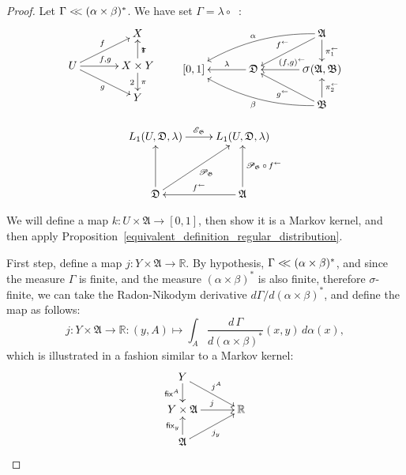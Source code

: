 \documentclass[
twoside=true,
paper=letter,
fontsize=9pt,
pagesize=auto,
leqno,
openany,
headsepline,
overfullrule,
]{scrbook}
\theoremstyle{plain}
\theoremstyle{plain}
\theoremstyle{definition}
\theoremstyle{bfnoteitalic}
\theoremstyle{bfnoteroman}
\newcommand{\sigalg}[1]{\mathfrak{#1}}
\newcommand{\cali}[1]{\mathscr{#1}}
\newcommand{\sfop}[1]{\mathsf{#1}}
\newcommand{\condexpop}[1]{\mathop{\cali{E}\hspace{-1pt}}\nolimits_{#1}}
\newcommand{\condprobop}[1]{\mathop{\cali{P}\hspace{-1pt}}\nolimits_{#1}}
\newcommand{\sagb}{\mathop{\hbox{\large{$\sigma$}}}\nolimits}
\newcommand{\textsigma}{\hbox{\large{$\sigma$}}\kern-1pt}
\newcommand{\preimage}[1]{\mathop{#1^{\leftarrow}}}
\newcommand{\R}{\mathbb{R}}
\newcommand{\sigmaalgebra}{\sigalg{A}}
\newcommand{\sigmaalgebraii}{\sigalg{B}}
\newcommand{\productsig}[2]{\sagb(#1,#2)}
\newcommand{\funcf}{f}
\newcommand{\funcg}{g}
\newcommand{\funcj}{j}
\newcommand{\funck}{k}
\newcommand{\function}{f}
\newcommand{\measurespace}{X}
\newcommand{\measurespaceii}{Y}
\newcommand{\mspaceelt}{x}
\newcommand{\mspaceeltii}{y}
\newcommand{\abscont}{\mathrel{< \kern-3.5pt <}}
\newcommand{\measlambda}{\lambda}
\newcommand{\seti}{A}
\newcommand{\projectionone}{\pi_1}
\newcommand{\projectiontwo}{\pi_2}
\newcommand{\fixinthefirst}[1]{\sfop{fix}_{#1}}
\newcommand{\fixinthesecond}[1]{\sfop{fix}^{#1}}
\newcommand{\uspace}{U}%
\newcommand{\uspacesig}{\sigalg{D}}
\newcommand{\joint}{\Gamma}%
\newcommand{\measonprod}{\Gamma}%
\newcommand{\marginalone}{\alpha}%
\newcommand{\marginaltwo}{\beta}%
\begin{document}
\begin{proof}
Let $\joint \abscont (\marginalone\times\marginaltwo)^*$.
We have set
$\joint = \measlambda\circ\preimage{({\funcf,\funcg})}$:
\[
\xymatrix@R=16pt@C=34pt{
 & \measurespace
 \\
 \uspace
 \ar[ur]^{\funcf}
 \ar[dr]_{\funcg}
 \ar[r]^{\funcf, \funcg} &
 \measurespace \times \measurespaceii  \ar[u]_\projectionone \ar[d]^\projectiontwo
 \\
 & \measurespaceii  \\
}
\qquad
\xymatrix@R=18pt@C=34pt{
 & & \sigmaalgebra
 \ar[dl]_{\preimage{\funcf}}
 \ar[d]^{\preimage{\projectionone}}
 \ar@/_10pt/[lld]_{\marginalone}
 \\
 [0,1] & \uspacesig \ar[l]_-{\measlambda} &
 \productsig{\sigmaalgebra}{\sigmaalgebraii}
 \ar[l]_{\hskip8pt \preimage{(\funcf,\funcg)}}
 \\
 & & \sigmaalgebraii
  \ar[u]_{\preimage{\projectiontwo}}
  \ar[ul]^{\preimage{\funcg}}
  \ar@/^10pt/[llu]^{\marginaltwo}
  \\
}
\]


\[%
\xymatrix@R=16pt@C=24pt{
L_1(\uspace, \uspacesig, \measlambda) \ar[r]^{\condexpop{\sigalg{G}}}
& L_1(\uspace, \uspacesig, \measlambda)
\\
&
\\
\uspacesig \ar[uu] \ar[uur]_{ \condprobop{\sigalg{G}} }
& \sigmaalgebra
\ar[uu]_{ \condprobop{\sigalg{G}} \circ \preimage{\function} }
\ar[l]_{\preimage{\funcf}}
\\
}
\]

We will define a map
$\funck: \uspace\times \sigmaalgebra \to [0,1]$, then show it is a Markov kernel, and then apply Proposition~\ref{equivalent_definition_regular_distribution}.


First step, define a map
$\funcj:\measurespaceii\times\sigmaalgebra\to \R$. By hypothesis,
$\measonprod \abscont (\marginalone\times\marginaltwo)^*$, and since the measure
$\measonprod$ is finite, and the measure $(\marginalone\times\marginaltwo)^*$ is also finite, therefore \textsigma\hyp{}finite, we can take the Radon-Nikodym derivative
$d\measonprod / d(\marginalone\times\marginaltwo)^*$, and define the map as follows:
\[
\funcj
:\measurespaceii\times\sigmaalgebra\to \R
:(\mspaceeltii,\seti)\mapsto
\int_\seti
\dfrac{d\,\measonprod}{d(\marginalone\times\marginaltwo)^*}
(\mspaceelt,\mspaceeltii)\, d\marginalone(\mspaceelt),
\]
which is illustrated in a fashion similar to a Markov kernel:
\[
\xymatrix@R=16pt@C=30pt{
\measurespaceii
\ar[d]_-{\fixinthesecond{\seti}}
\ar[dr]^{\funcj^\seti} &
\\
\measurespaceii\times\sigmaalgebra \ar[r]^{\funcj} & \R
\\
\sigmaalgebra
\ar[ur]_{\funcj_\mspaceeltii}
\ar[u]^{\fixinthefirst{\mspaceeltii}} &
\\
}
\]


\end{proof}
\end{document}

